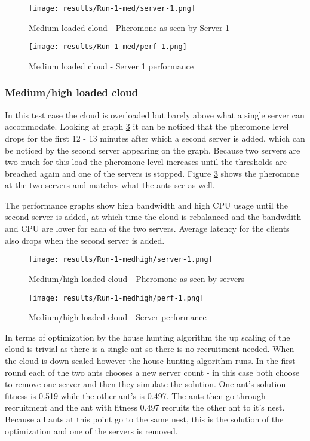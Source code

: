 \begin{figure}
	\centering
		\texttt{[image: results/Run-1-med/server-1.png]}
	\caption{Medium loaded cloud - Pheromone as seen by Server 1}
	\label{fig:1serv-pher-med}
\end{figure}

\begin{figure}
	\centering
		\texttt{[image: results/Run-1-med/perf-1.png]}
	\caption{Medium loaded cloud - Server 1 performance}
	\label{fig:1serv-perf-med}
\end{figure}

\subsubsection{Medium/high loaded cloud}

In this test case the cloud is overloaded but barely above what a single server can accommodate. Looking at graph \ref{fig:1serv-pher-medhigh} it can be noticed that the pheromone level drops for the first 12 - 13 minutes after which a second server is added, which can be noticed by the second server appearing on the graph.  Because two servers are two much for this load the pheromone level increases until the thresholds are breached again and one of the servers is stopped. Figure \ref{fig:1serv-pher-medhigh} shows the pheromone at the two servers and matches what the ants see as well.

The performance graphs show high bandwidth and high CPU usage until the second server is added, at which time the cloud is rebalanced and the bandwdith and CPU are lower for each of the two servers. Average latency for the clients also drops when the second server is added.

\begin{figure}
	\centering
		\texttt{[image: results/Run-1-medhigh/server-1.png]}
	\caption{Medium/high loaded cloud - Pheromone as seen by servers}
	\label{fig:1serv-pher-medhigh}
\end{figure}

\begin{figure}
	\centering
		\texttt{[image: results/Run-1-medhigh/perf-1.png]}
	\caption{Medium/high loaded cloud - Server performance}
	\label{fig:1serv-perf-medhigh}
\end{figure}

In terms of optimization by the house hunting algorithm the up scaling of the cloud is trivial as there is a single ant so there is no recruitment needed. When the cloud is down scaled however the house hunting algorithm runs. In the first round each of the two ants chooses a new server count - in this case both choose to remove one server and then they simulate the solution. One ant's solution fitness is 0.519 while the other ant's is 0.497. The ants then go through recruitment and the ant with fitness 0.497 recruits the other ant to it's nest. Because all ants at this point go to the same nest, this is the solution of the optimization and one of the servers is removed.

